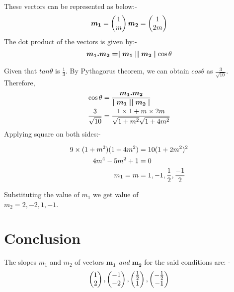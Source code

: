 \documentclass[conference]{IEEEtran}
\newcommand{\myvec}[1]{\ensuremath{\begin{pmatrix}#1\end{pmatrix}}}
\begin{document}
These vectors can be represented as below:-
\begin{align}\notag
\bm{m_{1}} =\myvec{ 1 \\m }
\bm{m_{2}} =\myvec{1\\2m}
 \end{align}
The dot product of the vectors is given by:-
\begin{align}\notag
 \bm{m_{1}  .  m_{2} = \mid m_{1}\mid \mid m_{2}\mid } \cos \theta
\end{align}

Given that $tan \theta$ is $\frac{1}{3}$. By Pythagorus theorem, we can obtain $cos \theta$ as $\frac{3}{\sqrt{10}}$.
Therefore,
\begin{align}\notag
\cos \theta &= \frac{\bm{m_{1}  .  m_{2}}}{\bm{\mid m_{1}\mid \mid m_{2}\mid}}\\\notag
\frac{3}{\sqrt{10}} &=  \frac{1 \times 1 + {m \times 2m}}{{\sqrt{1 + m^2}\sqrt{1 +4 m^2}}}
\end{align}
Applying square on both sides:-

\begin{align}\notag
9 \times (1 + m^2) (1 + 4 m^2) & = 10 ( 1 + 2 m^2)^2\\ \notag
4 m^4 - 5 m^2 + 1 &=0\\ \notag
m_{1} = m &= 1, -1,\frac{1}{2},\frac{-1}{2}
\end{align}

Substituting the value of $ m_{1}$ we get value of\\
$ m_{2} = 2, -2, 1, -1$.\\

\section{Conclusion}
The slopes $ m_{1}$ and $ m_{2} $ of vectors \textit{$\bm{m_{1}}$  and    $\bm{m_{2}}$} for the said conditions are: -
 \begin{align}\notag
\myvec{1 \\ 2} , \myvec{-1 \\ -2} ,\myvec{ \frac{1}{2}\\1} ,\myvec{- \frac{1}{2}\\ -1}
\end{align}
\end{document}
